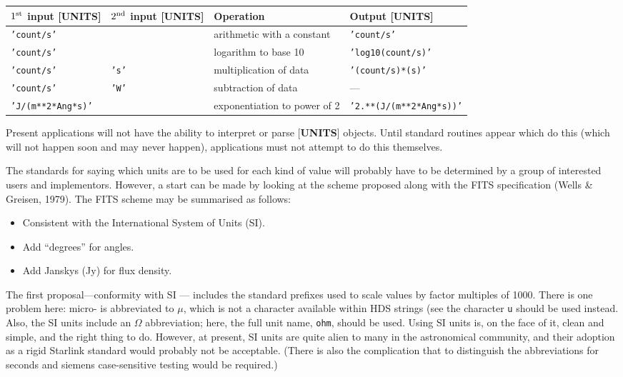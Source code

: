 \smallskip
\begin{center}
\begin{tabular}{llll}
$1^{\rm st}$ input {[}{\bf UNITS}{]} & $2^{\rm nd}$ input {[}{\bf UNITS}{]} &
Operation & Output {[}{\bf UNITS}{]} \\ \hline
{\tt 'count/s'} & & arithmetic with a constant & {\tt 'count/s'} \\
{\tt 'count/s'} & & logarithm to base 10 & {\tt 'log10(count/s)'} \\
{\tt 'count/s'} & {\tt 's'} & multiplication of data & {\tt '(count/s)*(s)'} \\
{\tt 'count/s'} & {\tt 'W'} & subtraction of data & --- \\
{\tt 'J/(m**2*Ang*s)'} & & exponentiation to power of 2 &
{\tt '2.**(J/(m**2*Ang*s))'} \\ \hline
\end{tabular}
\end{center}
\medskip
Present applications will not have the ability to interpret or parse
{[}{\bf UNITS}{]} objects.
Until standard routines appear
which do this (which will not happen soon and may never
happen), applications must not attempt to do this themselves.

The standards for saying which units are to be used for each kind
of value will probably have to be determined by a group of
interested users and implementors.
However, a start can be made by looking at the scheme proposed along
with the {\small FITS} specification (Wells \& Greisen, 1979).
The {\small FITS} scheme may be summarised as follows:
\begin{itemize}
\item Consistent with the International System of Units (SI).
\item Add ``degrees'' for angles.
\item Add Janskys (Jy) for flux density.
\end{itemize}

The first proposal---conformity with SI ---
includes the standard prefixes used to
scale values by factor multiples of 1000.  There is one problem here:
micro- is abbreviated to $\mu$, which is not a character available
within HDS strings (see 
the character {\tt u} should be
used instead.  Also, the SI units include an
$\Omega$ abbreviation; here, the full unit name,
{\tt ohm}, should be used.
Using SI units is, on the face of it, clean and simple, and the right thing 
to do.
However, at present, SI units are quite alien to many in the
astronomical community, and their adoption as a rigid Starlink standard
would probably not be acceptable.  (There is also the
complication that to distinguish the abbreviations for
seconds and siemens case-sensitive testing would be required.)

